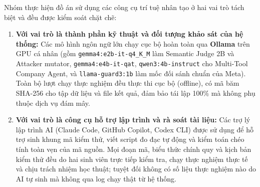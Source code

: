 Nhóm thực hiện đồ án sử dụng các công cụ trí tuệ nhân tạo ở hai vai trò tách biệt và đều được kiểm soát chặt chẽ:
\begin{enumerate}
    \item \textbf{Với vai trò là thành phần kỹ thuật và đối tượng khảo sát của hệ thống:} Các mô hình ngôn ngữ lớn chạy cục bộ hoàn toàn qua \textbf{Ollama} trên GPU cá nhân (gồm \texttt{gemma4:e2b-\allowbreak it-\allowbreak q4\_\allowbreak K\_\allowbreak M} làm Semantic Judge 2B và Attacker mutator, \texttt{gemma4:e4b-\allowbreak it-\allowbreak qat}, \texttt{qwen3:4b-\allowbreak instruct} cho Multi-Tool Company Agent, và \texttt{llama-\allowbreak guard3:1b} làm mốc đối sánh chuẩn của Meta). Toàn bộ lượt chạy thực nghiệm đều thực thi cục bộ (offline), có mã băm SHA-256 cho tập dữ liệu và file kết quả, đảm bảo tái lập 100\% mà không phụ thuộc dịch vụ đám mây.
    \item \textbf{Với vai trò là công cụ hỗ trợ lập trình và rà soát tài liệu:} Các trợ lý lập trình AI (Claude Code, GitHub Copilot, Codex CLI) được sử dụng để hỗ trợ sinh khung mã kiểm thử, viết script đo đạc tự động và kiểm toán chéo tính toàn vẹn của mã nguồn. Mọi đoạn mã, biểu thức chính quy và kịch bản kiểm thử đều do hai sinh viên trực tiếp kiểm tra, chạy thực nghiệm thực tế và chịu trách nhiệm học thuật; tuyệt đối không có số liệu thực nghiệm nào do AI tự sinh mà không qua log chạy thật từ hệ thống.
\end{enumerate}
